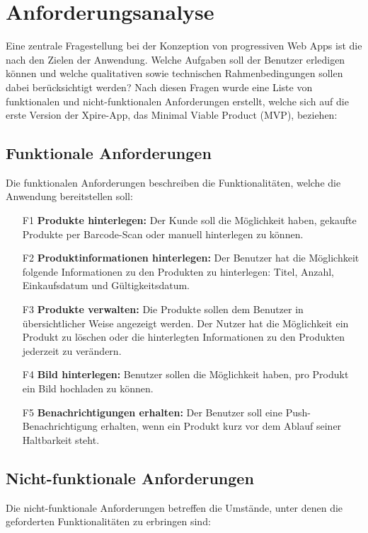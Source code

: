 \section{Anforderungsanalyse}
Eine zentrale Fragestellung bei der Konzeption von progressiven Web Apps ist die nach den Zielen der Anwendung. Welche Aufgaben soll der Benutzer erledigen können und welche qualitativen sowie technischen Rahmenbedingungen sollen dabei berücksichtigt werden? Nach diesen Fragen wurde eine Liste von funktionalen und nicht-funktionalen Anforderungen erstellt, welche sich auf die erste Version der Xpire-App, das Minimal Viable Product (MVP), beziehen:

\subsection{Funktionale Anforderungen}
Die funktionalen Anforderungen beschreiben die Funktionalitäten, welche die Anwendung bereitstellen soll:
\begin{itemize}[noitemsep]
	\item[F1] \textbf{Produkte hinterlegen:} Der Kunde soll die Möglichkeit haben, gekaufte Produkte per Barcode-Scan oder manuell hinterlegen zu können.
	\item[F2] \textbf{Produktinformationen hinterlegen:} Der Benutzer hat die Möglichkeit folgende Informationen zu den Produkten zu hinterlegen: Titel, Anzahl, Einkaufsdatum und Gültigkeitsdatum.
	\item[F3] \textbf{Produkte verwalten:} Die Produkte sollen dem Benutzer in übersichtlicher Weise angezeigt werden. Der Nutzer hat die Möglichkeit ein Produkt zu löschen oder die hinterlegten Informationen zu den Produkten jederzeit zu verändern.
	\item[F4] \textbf{Bild hinterlegen:} Benutzer sollen die Möglichkeit haben, pro Produkt ein Bild hochladen zu können.
	\item[F5] \textbf{Benachrichtigungen erhalten:} Der Benutzer soll eine Push-Benachrichtigung erhalten, wenn ein Produkt kurz vor dem Ablauf seiner Haltbarkeit steht.
\end{itemize}

\subsection{Nicht-funktionale Anforderungen}
Die nicht-funktionale Anforderungen betreffen die Umstände, unter denen die geforderten Funktionalitäten zu erbringen sind:

